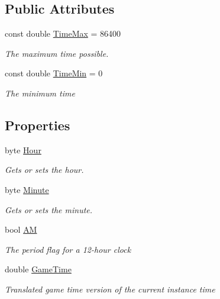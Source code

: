 \subsection*{Public Attributes}
\begin{DoxyCompactItemize}
\item 
const double \hyperlink{struct_o_t_a_1_1_command_1_1_world_time_a313c8ab82be9442238de88cd276a3376}{Time\+Max} = 86400
\begin{DoxyCompactList}\small\item\em The maximum time possible. \end{DoxyCompactList}\item 
const double \hyperlink{struct_o_t_a_1_1_command_1_1_world_time_a9e80e88421ce390cbb2e432022affc14}{Time\+Min} = 0
\begin{DoxyCompactList}\small\item\em The minimum time \end{DoxyCompactList}\end{DoxyCompactItemize}
\subsection*{Properties}
\begin{DoxyCompactItemize}
\item 
byte \hyperlink{struct_o_t_a_1_1_command_1_1_world_time_a5b31766a1acd5d3f7f6deb12883cd1a9}{Hour}
\begin{DoxyCompactList}\small\item\em Gets or sets the hour. \end{DoxyCompactList}\item 
byte \hyperlink{struct_o_t_a_1_1_command_1_1_world_time_a7deec67732fa18d400ee5e78627721e2}{Minute}
\begin{DoxyCompactList}\small\item\em Gets or sets the minute. \end{DoxyCompactList}\item 
bool \hyperlink{struct_o_t_a_1_1_command_1_1_world_time_ae17654fb336d0a2dd8a930a4d93733db}{A\+M}
\begin{DoxyCompactList}\small\item\em The period flag for a 12-\/hour clock \end{DoxyCompactList}\item 
double \hyperlink{struct_o_t_a_1_1_command_1_1_world_time_a0344e73e9fe07b1bc486b4f82ccd1621}{Game\+Time}
\begin{DoxyCompactList}\small\item\em Translated game time version of the current instance time \end{DoxyCompactList}\end{DoxyCompactItemize}


